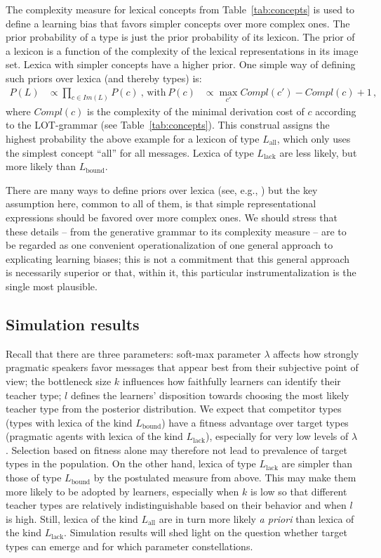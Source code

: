 \documentclass[a4paper, 11pt]{article}
\theoremstyle{Satz}
\newcommand{\mylang}[1]{\ensuremath{L_{\text{#1}}}\xspace} %
\newcommand{\Lall}{\mylang{all}}
\newcommand{\Lbound}{\mylang{bound}}
\newcommand{\Llack}{\mylang{lack}}
\begin{document}
The complexity measure for lexical concepts from Table~\ref{tab:concepts} is used to define a
learning bias that favors simpler concepts over more complex ones. The prior probability of a
type is just the prior probability of its lexicon. The prior of a lexicon is a function of the
complexity of the lexical representations in its image set. Lexica with simpler concepts have a
higher prior. One simple way of defining such priors over lexica (and thereby types) is:
\begin{align*}
  P(L)  & \propto \prod_{c \in Im(L)} P(c)   \ \text{, with} & 
  P(c) & \propto \max_{c'}Compl(c') - Compl(c) + 1\,,
\end{align*}
where $Compl(c)$ is the complexity of the minimal derivation cost of $c$ according to the
LOT-grammar (see Table~\ref{tab:concepts}). This construal assigns the highest probability the
above example for a lexicon of type $\Lall$, which only uses the simplest concept ``all'' for
all messages. Lexica of type $\Llack$ are less likely, but more likely than $\Lbound$. 

There are many ways to define priors over lexica (see, e.g., \citealt{goodman+etal:2008,
  piantadosi+etal:2012a}) but the key assumption here, common to all of them, is that simple
representational expressions should be favored over more complex ones. We should stress that
these details -- from the generative grammar to its complexity measure -- are to be regarded as
one convenient operationalization of one general approach to explicating learning biases; this
is not a commitment that this general approach is necessarily superior or that, within it, this
particular instrumentalization is the single most plausible.


\subsection{Simulation results}
\label{sec:simulation-results}

Recall that there are three parameters: soft-max parameter $\lambda$ affects how strongly
pragmatic speakers favor messages that appear best from their subjective point of view; the
bottleneck size $k$ influences how faithfully learners can identify their teacher type; $l$
defines the learners' disposition towards choosing the most likely teacher type from the
posterior distribution. We expect that competitor types (types with lexica of the kind
$\Lbound$) have a fitness advantage over target types (pragmatic agents with lexica of the kind
$\Llack$), especially for very low levels of $\lambda$. Selection based on fitness alone may
therefore not lead to prevalence of target types in the population. On the other hand, lexica
of type $\Llack$ are simpler than those of type $\Lbound$ by the postulated measure from
above. This may make them more likely to be adopted by learners, especially when $k$ is low so
that different teacher types are relatively indistinguishable based on their behavior and when
$l$ is high. Still, lexica of the kind $\Lall$ are in turn more likely \emph{a priori} than
lexica of the kind $\Llack$. Simulation results will shed light on the question whether target
types can emerge and for which parameter constellations.
\end{document}
